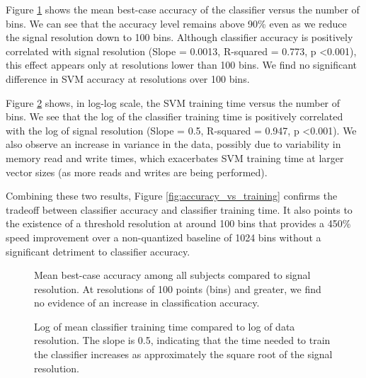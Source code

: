 Figure \ref{fig:accuracy_vs_bins} shows the mean best-case accuracy of the classifier versus the number of bins. We can see that the accuracy level remains above 90\% even as we reduce the signal resolution down to 100 bins. Although classifier accuracy is positively correlated with signal resolution (Slope = 0.0013, R-squared = 0.773, p \textless 0.001), this effect appears only at resolutions lower than 100 bins. We find no significant difference in SVM accuracy at resolutions over 100 bins.

Figure \ref{fig:training_vs_bins} shows, in log-log scale, the SVM training time versus the number of bins. We see that the log of the classifier training time is positively correlated with the log of signal resolution (Slope = 0.5, R-squared = 0.947, p \textless 0.001). We also observe an increase in variance in the data, possibly due to variability in memory read and write times, which exacerbates SVM training time at larger vector sizes (as more reads and writes are being performed).

Combining these two results, Figure \ref{fig:accuracy_vs_training} confirms the tradeoff between classifier accuracy and classifier training time. It also points to the existence of a threshold resolution at around 100 bins that provides a 450\% speed improvement over a non-quantized baseline of 1024 bins without a significant detriment to classifier accuracy.


\begin{figure}[!h]
  \centering
   {}
  \caption{Mean best-case accuracy among all subjects compared to signal resolution. At resolutions of 100 points (bins) and greater, we find no evidence of an increase in classification accuracy. }
  \label{fig:accuracy_vs_bins}
  \vspace{-0.1cm}
 \end{figure}

 \begin{figure}[!h]
  \vspace{-0.2cm}
  \centering
   {}
  \caption{Log of mean classifier training time compared to log of data resolution. The slope is 0.5, indicating that the time needed to train the classifier increases as approximately the square root of the signal resolution.}
  \label{fig:training_vs_bins}
  \vspace{-0.1cm}
 \end{figure}

